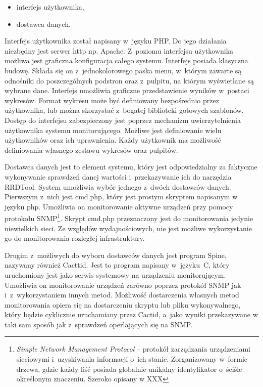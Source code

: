 \begin{itemize}
\item interfejs użytkownika,
\item dostawca danych.
\end{itemize}

Interfejs użytkownika został napisany w~języku PHP. Do jego działania
niezbędny jest serwer http np. Apache. Z~poziomu interfejsu
użytkownika możliwa jest graficzna konfiguracja całego
systemu. Interfejs posiada klasyczna budowę. Składa się on
z~jednokolorowego paska menu, w~którym zawarte są odnośniki do
poszczególnych podstron oraz z~pulpitu, na którym wyświetlane są
wybrane dane. Interfejs umożliwia graficzne przedstawienie wyników
w~postaci wykresów. Format wykresu może być definiowany bezpośrednio
przez użytkownika, lub można skorzystać z~bogatej biblioteki gotowych
szablonów. Dostęp do interfejsu zabezpieczony jest poprzez mechanizm
uwierzytelnienia użytkownika systemu monitorującego. Możliwe jest
definiowanie wielu użytkowników oraz ich uprawnienia. Każdy użytkownik
ma możliwość definiowania własnego zestawu wykresów oraz pulpitów.

Dostawca danych jest to element systemu, który jest odpowiedzialny za
faktyczne wykonywanie sprawdzeń danej wartości i~przekazywanie ich do
narzędzia RRDTool. System umożliwia wybór jednego z~dwóch dostawców
danych. Pierwszym z~nich jest cmd.php, który jest prostym skryptem
napisanym w języku php. Umożliwia on monitorowanie aktywne urządzeń
przy pomocy protokołu SNMP\footnote{ {\em Simple Network Management
    Protocol} -- protokół zarządzania urządzeniami sieciowymi
  i~uzyskiwania informacji o~ich stanie. Zorganizowany w~formie
  drzewa, gdzie każdy liść posiada globalnie unikalny identyfikator
  o~ściśle określonym znaczeniu. Szeroko opisany w XXX}. Skrypt
cmd.php przeznaczony jest do monitorowania jedynie niewielkich
sieci. Ze względów wydajnościowych, nie jest możliwe wykorzystanie go
do monitorowania rozległej infrastruktury.

Drugim z~możliwych do wyboru dostawców danych jest program Spine,
nazywany również Cacttid. Jest to program napisany w~języku~C, który
uruchomiony jest jako serwis systemowy na urządzeniu
monitorującym. Umożliwia on monitorowanie urządzeń zarówno poprzez
protokół SNMP jak i~z~wykorzystaniem innych metod. Możliwość
dostarczenia własnych metod monitorowania opiera się na dostarczeniu
skryptu lub pliku wykonywalnego, który będzie cyklicznie uruchamiany
przez Cactid, a~jako wyniki przekazywane w taki sam sposób jak
z~sprawdzeń operlających się na SNMP.

